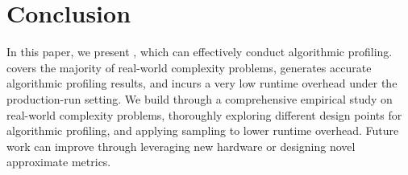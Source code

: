 \section{Conclusion}
\label{sec:con}

In this paper, we present \Tool, which can effectively conduct algorithmic profiling.
\Tool covers the majority of real-world complexity problems, 
generates accurate algorithmic profiling results, 
and incurs a very low runtime overhead under the production-run setting. 
We build \Tool through a comprehensive empirical study on real-world complexity problems, 
thoroughly exploring different design points for algorithmic profiling, 
and applying sampling to lower runtime overhead. 
Future work can improve \Tool through leveraging 
new hardware or designing novel approximate metrics. 
